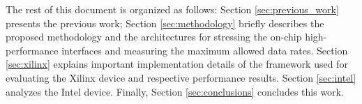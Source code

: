 The rest of this document is organized as follows: Section \ref{sec:previous_work} presents the previous work; Section \ref{sec:methodology} briefly describes the proposed methodology and the architectures for stressing the on-chip high-performance interfaces and measuring the maximum allowed data rates. Section \ref{sec:xilinx} explains important implementation details of the framework used for evaluating the Xilinx device and respective performance results. Section \ref{sec:intel} analyzes the Intel device. Finally, Section \ref{sec:conclusions} concludes this work.